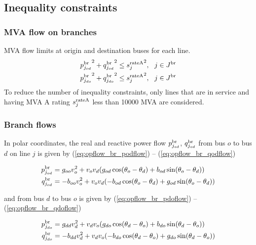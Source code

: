 \subsection{Inequality constraints}

\subsubsection{MVA flow on branches}
MVA flow limits at origin and destination buses for each line.
\begin{align}
  {p^\text{br}_{j_{od}}}^2 + {q^\text{br}_{j_{od}}}^2 \le {s^{\text{rateA}}_j}^2,~~j \in J^\text{br}\\
  {p^\text{br}_{j_{do}}}^2 + {q^\text{br}_{j_{do}}}^2 \le {s^{\text{rateA}}_j}^2,~~j \in J^\text{br}
\end{align}
To reduce the number of inequality constraints, only lines that are in service and having MVA A rating $s^{\text{rateA}}_j$ less than 10000 MVA are considered.

\subsubsection{Branch flows}
In polar coordinates, the real and reactive power flow $p^\text{br}_{j_{od}}$, $q^\text{br}_{j_{od}}$  from bus $o$ to bus $d$ on line $j$ is given by (\ref{eq:opflow_br_podflow}) -- 
 (\ref{eq:opflow_br_qodflow})


\begin{align}
p^\text{br}_{j_{od}} &= g_{oo}{v^2_o} + v_ov_d(g_{od}\cos(\theta_o - \theta_d) + b_{od}\sin(\theta_o - \theta_d)) \label{eq:opflow_br_podflow}\\
q^\text{br}_{j_{od}} &= -b_{oo}{v^2_o} + v_ov_d(-b_{od}\cos(\theta_o - \theta_d) + g_{od}\sin(\theta_o - \theta_d)) \label{eq:opflow_br_qodflow}
\end{align}

\noindent
and from bus $d$ to bus $o$ is given by (\ref{eq:opflow_br_pdoflow}) -- (\ref{eq:opflow_br_qdoflow})

\begin{align}
p^\text{br}_{j_{do}} &= g_{dd}{v^2_d} + v_dv_o(g_{do}\cos(\theta_d - \theta_o) + b_{do}\sin(\theta_d - \theta_o))  \label{eq:opflow_br_pdoflow} \\
q^\text{br}_{j_{do}} &= -b_{dd}{v^2_d} + v_dv_o(-b_{do}\cos(\theta_d - \theta_o) + g_{do}\sin(\theta_d - \theta_o)) \label{eq:opflow_br_qdoflow}
\end{align}

